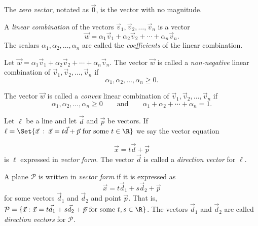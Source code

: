 \begin{SaveDefinition}[key=ZeroVector, title={Zero Vector}]
		The \emph{zero vector}, notated as $\vec 0$,
		is the vector with no magnitude.
\end{SaveDefinition}

\begin{SaveDefinition}[key=LinearCombination, title={Linear Combination}]
	A \emph{linear combination} of the vectors
	$\vec v_{1},\vec v_{2},\ldots,\vec v_{n}$ is a vector
	\[
		\vec w = \alpha_{1}\vec v_{1}+\alpha_{2}\vec v_{2}+\cdots+\alpha_{n}\vec
		v_{n}.
	\]
	 The scalars $\alpha_{1},\alpha_{2},\ldots,\alpha_{n}$ are called the
	\emph{coefficients} of the linear combination.
\end{SaveDefinition}

\begin{SaveDefinition}[
	key=NonnegativeConvexLinearCombinations,
	title={Non-negative \& Convex Linear Combinations}]

	Let
	$\vec w=\alpha_{1}\vec v_{1}+\alpha_{2}\vec v_{2}+\cdots+\alpha_{n}\vec
	v_{n}.$
	The vector $\vec w$ is called a 
	\emph{non-negative} linear combination of
	$\vec v_{1},\vec v_{2},\ldots,\vec v_{n}$ if
	\[\alpha_{1},\alpha_{2},\ldots,\alpha_{n}\geq 0.\]

	The vector $\vec w$ is called a 
	\emph{convex} linear combination of
	$\vec v_{1},\vec v_{2},\ldots,\vec v_{n}$
	if \[\alpha_{1},\alpha_{2},\ldots,\alpha_{n}\geq 0\qquad\text{and}\qquad
	\alpha_{1}+\alpha_{2}+\cdots+\alpha_{n}=1.\]
\end{SaveDefinition}

\begin{SaveDefinition}[key=VectorFormofaLine, title={Vector Form of a Line}]
	Let $\ell$ be a line and let $\vec d$ and $\vec p$ be vectors. If $\ell=\Set{\vec
	x\given \vec x= t\vec d+\vec p\text{ for some } t\in\R }$ we say the vector equation

	\[
		\vec x=t\vec d+\vec p
	\]
	 is $\ell$ expressed in
	\emph{vector form}. The vector $\vec d$ is called a
	\emph{direction vector} for $\ell$.
\end{SaveDefinition}

\begin{SaveDefinition}[key=VectorFormofaPlane, title={Vector Form of a Plane}]
	A plane $\mathcal P$ is written in
	\emph{vector form} if it is expressed as
	\[
		\vec x=t\vec d_{1} +s\vec d_{2}+\vec p
	\]
	 for some vectors $\vec d_{1}$ and $\vec d_{2}$ and point $\vec p$. That
	is,
	$\mathcal P = \{\vec x: \vec x= t\vec d_{1}+s\vec d_{2} +\vec p\text{ for
	some }t,s\in\R \}$. The vectors $\vec d_{1}$ and $\vec d_{2}$ are called
	\emph{direction vectors} for $\mathcal P$.
\end{SaveDefinition}

